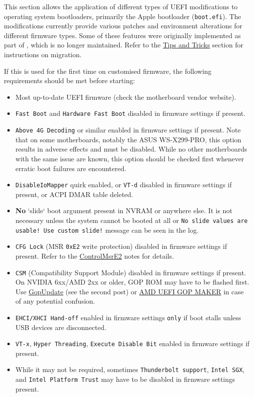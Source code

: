 \documentclass[]{article}
\providecommand{\tightlist}{%
  \setlength{\itemsep}{0pt}\setlength{\parskip}{0pt}}
\begin{document}
This section allows the application of different types of UEFI modifications to
operating system bootloaders, primarily the Apple bootloader (\texttt{boot.efi}).
The modifications currently provide various patches and environment alterations for
different firmware types. Some of these features were originally implemented as part
of \href{https://github.com/acidanthera/AptioFixPkg}{},
which is no longer maintained. Refer to the \hyperref[troubleshootingtricks]{Tips and Tricks}
section for instructions on migration.

If this is used for the first time on customised firmware, the following requirements
should be met before starting:

\begin{itemize}
\tightlist
\item Most up-to-date UEFI firmware (check the motherboard vendor website).
\item \texttt{Fast Boot} and \texttt{Hardware Fast Boot} disabled in firmware
  settings if present.
\item \texttt{Above 4G Decoding} or similar enabled in firmware
  settings if present. Note that on some motherboards, notably the ASUS WS-X299-PRO, this
  option results in adverse effects and must be disabled. While no other motherboards
  with the same issue are known, this option should be checked first whenever erratic boot
  failures are encountered.
\item \texttt{DisableIoMapper} quirk enabled, or \texttt{VT-d} disabled in
  firmware settings if present, or ACPI DMAR table deleted.
\item \textbf{No} `slide` boot argument present in NVRAM or anywhere else.
  It is not necessary unless the system cannot be booted at all or
  \texttt{No slide values are usable! Use custom slide!} message can be seen in the log.
\item \texttt{CFG Lock} (MSR \texttt{0xE2} write protection) disabled in
  firmware settings if present. Refer to the \hyperref[kernelpropsquirks]{ControlMsrE2}
  notes for details.
\item \texttt{CSM} (Compatibility Support Module) disabled in firmware settings
  if present. On NVIDIA 6xx/AMD 2xx or older, GOP ROM may have to be flashed first. Use
  \href{https://www.win-raid.com/t892f16-AMD-and-Nvidia-GOP-update-No-requests-DIY.html}{GopUpdate}
  (see the second post) or \href{http://www.insanelymac.com/forum/topic/299614-asus-eah6450-video-bios-uefi-gop-upgrade-and-gop-uefi-binary-in-efi-for-many-ati-cards/page-1#entry2042163}{AMD UEFI GOP MAKER}
  in case of any potential confusion.
\item \texttt{EHCI/XHCI Hand-off} enabled in firmware settings \texttt{only} if boot
  stalls unless USB devices are disconnected.
\item \texttt{VT-x}, \texttt{Hyper Threading}, \texttt{Execute Disable Bit} enabled
  in firmware settings if present.
\item While it may not be required, sometimes
  \texttt{Thunderbolt support}, \texttt{Intel SGX}, and \texttt{Intel Platform Trust}
  may have to be disabled in firmware settings present.
\end{itemize}
\end{document}
